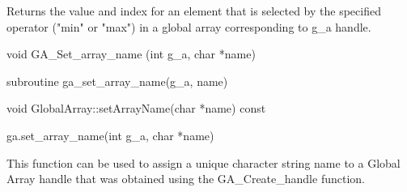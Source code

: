 \documentclass[12pt]{article}
\begin{document}
\gcoll

\begin{desc}

Returns the value and index for an element that is selected by the specified
operator ("min" or "max") in a global array corresponding to g_a handle.

\end{desc}


\begin{capi}
\begin{ccode}
void GA_Set_array_name (int g_a, char *name)
\end{ccode}
\begin{funcargs}
\end{funcargs}
\end{capi}

\begin{fapi}
\begin{fcode}
subroutine ga_set_array_name(g_a, name)
\end{fcode}
\begin{funcargs}
\end{funcargs}
\end{fapi}

\begin{cxxapi}
\begin{cxxcode}
void GlobalArray::setArrayName(char *name) const
\end{cxxcode}
\begin{funcargs}
\end{funcargs}
\end{cxxapi}

\begin{pyapi}
\begin{pycode}
ga.set_array_name(int g_a, char *name)
\end{pycode}
\begin{funcargs}
\end{funcargs}
\end{pyapi}

\gcoll

\begin{desc}

This function can be used to assign a unique character string name to a Global
Array handle that was obtained using the GA_Create_handle function.

\end{desc}
\end{document}
